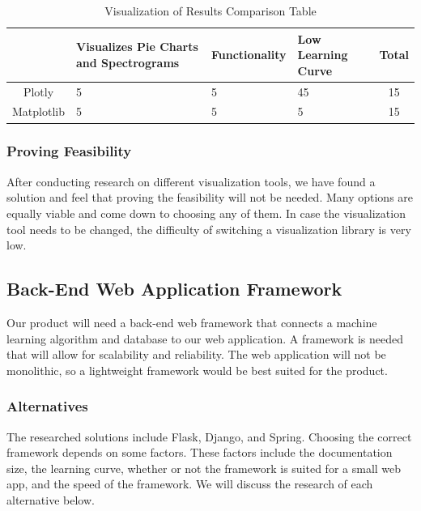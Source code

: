 \documentclass[12pt,journal,compsoc]{IEEEtran}
\newenvironment{subs}
  {\adjustwidth{1em}{0pt}}
  {\endadjustwidth}
\begin{document}
\begin{subs}
\begin{subs}
\begin{table}[H]
\renewcommand{\arraystretch}{1.3}
\caption{Visualization of Results Comparison Table}
\label{table_7}
\centering
\begin{tabular}{|c||m{8em}|m{8em}|m{8em}||c|}
\hline
&
Visualizes Pie Charts and Spectrograms
&
Functionality
&
Low Learning Curve
&
Total\\
\hline
\hline
Plotly & 5 & 5 & 45& 15\\
\hline
Matplotlib & 5 & 5 & 5 & 15\\
\hline
\end{tabular}
\end{table}

\subsubsection{Proving Feasibility}
After conducting research on different visualization tools, we have found a solution and feel that proving the feasibility will not be needed. Many options are equally viable and come down to choosing any of them. In case the visualization tool needs to be changed, the difficulty of switching a visualization library is very low.
\end{subs}

\subsection{Back-End Web Application Framework}
Our product will need a back-end web framework that connects a machine learning algorithm and database to our web application. A framework is needed that will allow for scalability and reliability. The web application will not be monolithic, so a lightweight framework would be best suited for the product.

\begin{subs}
\subsubsection{Alternatives}
The researched solutions include Flask, Django, and Spring. Choosing the correct framework depends on some factors. These factors include the documentation size, the learning curve, whether or not the framework is suited for a small web app, and the speed of the framework. We will discuss the research of each alternative below.


\end{subs}
\end{subs}
\end{document}
